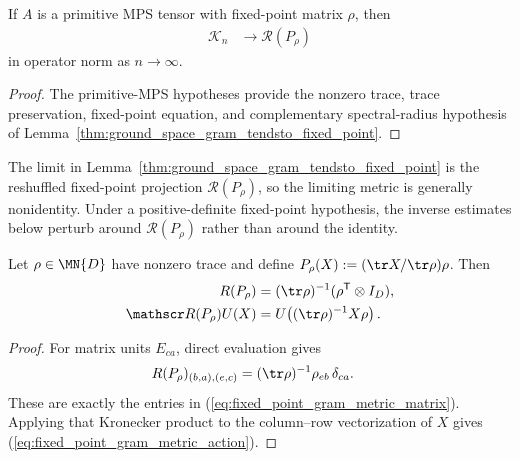 \begin{lemma}
    \label{thm:primitive_ground_space_gram_tendsto_fixed_point}
    \leanok
    If $A$ is a primitive MPS tensor with fixed-point matrix $\rho$, then
    \begin{align}
        \mathcal K_n & \longrightarrow\mathscr R(P_\rho)
    \end{align}
    in operator norm as $n\to\infty$.
\end{lemma}

\begin{proof}
    \leanok
    The primitive-MPS hypotheses provide the nonzero trace, trace preservation,
    fixed-point equation, and complementary spectral-radius hypothesis of
    Lemma~\ref{thm:ground_space_gram_tendsto_fixed_point}.
\end{proof}

The limit in Lemma~\ref{thm:ground_space_gram_tendsto_fixed_point} is
the reshuffled fixed-point projection $\mathscr R(P_\rho)$, so the
limiting metric is generally nonidentity.
Under a positive-definite fixed-point hypothesis, the inverse estimates
below perturb around $\mathscr R(P_\rho)$ rather than around the identity.

\begin{lemma}
    \label{thm:fixed_point_gram_metric_exact}
    \leanok
    Let $\rho\in\MN{D}$ have nonzero trace and define
    $P_\rho(X):=(\tr X/\tr\rho)\rho$.  Then
    \begin{align}
        R(P_\rho)
         & =(\tr\rho)^{-1}(\rho^{\mathsf T}\otimes I_D),
        \label{eq:fixed_point_gram_metric_matrix}        \\
        \mathscr R(P_\rho)U(X)
         & =U\!\left((\tr\rho)^{-1}X\rho\right).
        \label{eq:fixed_point_gram_metric_action}
    \end{align}
\end{lemma}

\begin{proof}
    \leanok
    For matrix units $E_{ca}$, direct evaluation gives
    \begin{align}
        R(P_\rho)_{(b,a),(e,c)}
         & =(\tr\rho)^{-1}\rho_{eb}\,\delta_{ca}.
    \end{align}
    These are exactly the entries in
    (\ref{eq:fixed_point_gram_metric_matrix}).  Applying that Kronecker product
    to the column--row vectorization of $X$ gives
    (\ref{eq:fixed_point_gram_metric_action}).
\end{proof}


